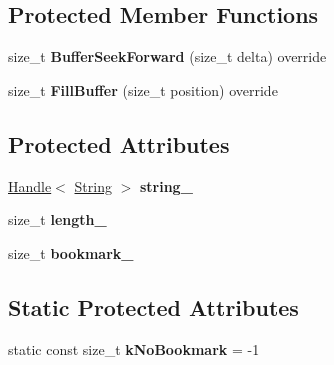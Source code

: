 \subsection*{Protected Member Functions}
\begin{DoxyCompactItemize}
\item 
size\+\_\+t {\bfseries Buffer\+Seek\+Forward} (size\+\_\+t delta) override\hypertarget{classv8_1_1internal_1_1_generic_string_utf16_character_stream_a1950538f4733dcc6e963f525b3cf8ec7}{}\label{classv8_1_1internal_1_1_generic_string_utf16_character_stream_a1950538f4733dcc6e963f525b3cf8ec7}

\item 
size\+\_\+t {\bfseries Fill\+Buffer} (size\+\_\+t position) override\hypertarget{classv8_1_1internal_1_1_generic_string_utf16_character_stream_a1bd4768972023ab231b77fe77a999e17}{}\label{classv8_1_1internal_1_1_generic_string_utf16_character_stream_a1bd4768972023ab231b77fe77a999e17}

\end{DoxyCompactItemize}
\subsection*{Protected Attributes}
\begin{DoxyCompactItemize}
\item 
\hyperlink{classv8_1_1internal_1_1_handle}{Handle}$<$ \hyperlink{classv8_1_1internal_1_1_string}{String} $>$ {\bfseries string\+\_\+}\hypertarget{classv8_1_1internal_1_1_generic_string_utf16_character_stream_a0c661cfae995c45e74c9a04c4fadf0f5}{}\label{classv8_1_1internal_1_1_generic_string_utf16_character_stream_a0c661cfae995c45e74c9a04c4fadf0f5}

\item 
size\+\_\+t {\bfseries length\+\_\+}\hypertarget{classv8_1_1internal_1_1_generic_string_utf16_character_stream_a8b656d2a90cf652ab852bd0f7dbe88ec}{}\label{classv8_1_1internal_1_1_generic_string_utf16_character_stream_a8b656d2a90cf652ab852bd0f7dbe88ec}

\item 
size\+\_\+t {\bfseries bookmark\+\_\+}\hypertarget{classv8_1_1internal_1_1_generic_string_utf16_character_stream_a3fd43ee2e90b23b9e76361b75b4bcb62}{}\label{classv8_1_1internal_1_1_generic_string_utf16_character_stream_a3fd43ee2e90b23b9e76361b75b4bcb62}

\end{DoxyCompactItemize}
\subsection*{Static Protected Attributes}
\begin{DoxyCompactItemize}
\item 
static const size\+\_\+t {\bfseries k\+No\+Bookmark} = -\/1\hypertarget{classv8_1_1internal_1_1_generic_string_utf16_character_stream_a76aa39c9a6ba431130ce7c2890a6c43c}{}\label{classv8_1_1internal_1_1_generic_string_utf16_character_stream_a76aa39c9a6ba431130ce7c2890a6c43c}

\end{DoxyCompactItemize}


